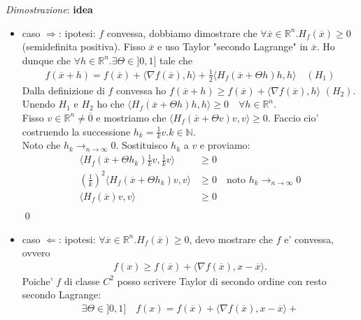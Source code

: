 \documentclass{article}
\begin{document}
\noindent \emph{Dimostrazione}: \textbf{idea} \\
\begin{itemize}
  \item caso $\Rightarrow$: ipotesi: $f$ convessa, dobbiamo dimostrare che $\forall \overline{x}
    \in \mathbb{R}^n. H_f(\overline{x}) \geq 0$ (semidefinita positiva). Fisso $\overline{x}$ e uso
    Taylor "secondo Lagrange" in $\overline{x}$. Ho dunque che $\forall h \in \mathbb{R}^n. \exists \Theta \in ]0,1]$ tale che
    \begin{align*}
      f(\overline{x} + h) = f(\overline{x}) + \langle \nabla f(\overline{x}), h \rangle +
      \frac{1}{2} \langle H_f(\overline{x} + \Theta h) h, h \rangle \quad (H_1)
    \end{align*}
    Dalla definizione di $f$  convessa ho $f(\overline{x} + h) \geq f(\overline{x}) + \langle
    \nabla f(\overline{x}), h \rangle$ $(H_2)$. \\
    Unendo $H_1$ e $H_2$ ho che $\langle H_f(\overline{x} + \Theta h) h, h \rangle
    \geq 0 \quad \forall h \in \mathbb{R}^n$. \\
    Fisso $v \in \mathbb{R}^n \neq \overline{0}$ e mostriamo che
    $\langle H_f(\overline{x} + \Theta v) v, v \rangle \geq 0$. Faccio cio' costruendo
    la successione $h_k = \frac{1}{k} v. k \in \mathbb{N}$. \\
    Noto che $h_k \to_{n\to\infty} 0$. Sostituisco $h_k$ a $v$ e proviamo:
    \begin{align*}
      \langle H_f(\overline{x} + \Theta h_k) \frac{1}{k}v, \frac{1}{k}v \rangle &\geq 0 \\
      (\frac{1}{k})^2 \langle H_f(\overline{x} + \Theta h_k) v, v \rangle &\geq 0 \quad \text{noto } h_k \to_{n\to\infty} 0\\
      \langle H_f(\overline{x}) v, v \rangle &\geq 0 \\
    \end{align*} \qed
  \item caso $\Leftarrow$: ipotesi: $\forall \overline{x} \in \mathbb{R}^n.
    H_f(\overline{x}) \geq 0$, devo mostrare che $f$ e' convessa, ovvero
    \begin{align*}
      f(x) \geq f(\overline{x}) + \langle \nabla f(\overline{x}), x-\overline{x} \rangle.
    \end{align*}
    Poiche' $f$ di classe $C^2$ posso scrivere Taylor di secondo ordine con resto secondo Lagrange:
    \begin{align*}
      \exists \Theta \in ]0,1] \quad f(x) = f(\overline{x}) + \langle \nabla f(\overline{x}), x - \overline{x} \rangle +

\end{align*}
\end{itemize}
\end{document}
